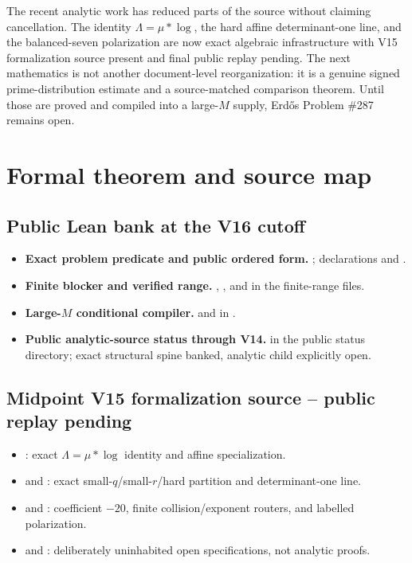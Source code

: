 \documentclass[11pt]{article}
\theoremstyle{definition}
\newcommand{\1}{\mathbf 1}
\begin{document}
The recent analytic work has reduced parts of the source without claiming cancellation.
The identity $\Lambda=\mu*\log$, the hard affine determinant-one line, and the
balanced-seven polarization are now exact algebraic infrastructure with V15 formalization
source present and final public replay pending.  The next
mathematics is not another document-level reorganization: it is a genuine signed
prime-distribution estimate and a source-matched comparison theorem.  Until those are
proved and compiled into a large-$M$ supply, Erd\H{o}s Problem \#287 remains open.

\appendix
\section{Formal theorem and source map}

\subsection*{Public Lean bank at the V16 cutoff}
\begin{itemize}[leftmargin=1.6em,itemsep=0.45em]
\item \textbf{Exact problem predicate and public ordered form.}
  ; declarations
   and
  .
\item \textbf{Finite blocker and verified range.}
  , , and
   in the finite-range files.
\item \textbf{Large-$M$ conditional compiler.}
   and
   in
  .
\item \textbf{Public analytic-source status through V14.}
   in the public status directory; exact structural
  spine banked, analytic child explicitly open.
\end{itemize}

\subsection*{Midpoint V15 formalization source -- public replay pending}
\begin{itemize}[leftmargin=1.6em,itemsep=0.45em]
\item {}: exact $\Lambda=\mu*\log$ identity and affine
  specialization.
\item {} and : exact
  small-$q$/small-$r$/hard partition and determinant-one line.
\item {} and :
  coefficient $-20$, finite collision/exponent routers, and labelled polarization.
\item {} and :
  deliberately uninhabited open specifications, not analytic proofs.
\end{itemize}
\end{document}
